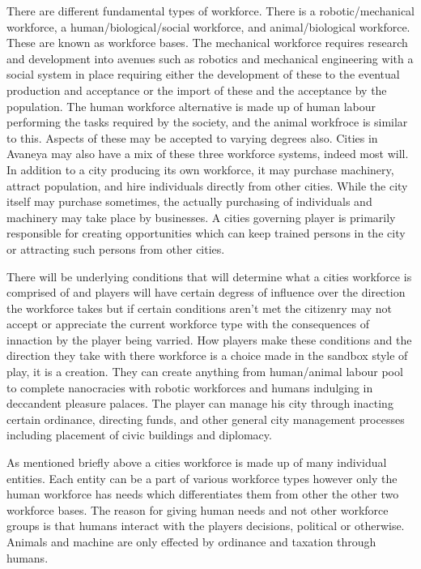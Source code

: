 There are different fundamental types of workforce. There is a robotic/mechanical workforce, a human/biological/social workforce, and animal/biological workforce. These are known as workforce bases. The mechanical workforce requires research and development into avenues such as robotics and mechanical engineering with a social system in place requiring either the development of these to the eventual production and acceptance or the import of these and the acceptance by the population. The human workforce alternative is made up of human labour performing the tasks required by the society, and the animal workfroce is similar to this. Aspects of these may be accepted to varying degrees also. Cities in Avaneya may also have a mix of these three workforce systems, indeed most will. In addition to a city producing its own workforce, it may purchase machinery, attract population, and hire individuals directly from other cities. While the city itself may purchase sometimes, the actually purchasing of individuals and machinery may take place by businesses. A cities governing player is primarily responsible for creating opportunities which can keep trained persons in the city or attracting such persons from other cities. 

There will be underlying conditions that will determine what a cities workforce is comprised of and players will have certain degress of influence over the direction the workforce takes but if certain conditions aren't met the citizenry may not accept or appreciate the current workforce type with the consequences of innaction by the player being varried. How players make these conditions and the direction they take with there workforce is a choice made in the sandbox style of play, it is a creation. They can create anything from human/animal labour pool to complete nanocracies with robotic workforces and humans indulging in deccandent pleasure palaces. The player can manage his city through inacting certain ordinance, directing funds, and other general city management processes including placement of civic buildings and diplomacy. 


As mentioned briefly above a cities workforce is made up of many individual entities. Each entity can be a part of various workforce types however only the human workforce has needs which differentiates them from other the other two workforce bases. The reason for giving human needs and not other workforce groups is that humans interact with the players decisions, political or otherwise. Animals and machine are only effected by ordinance and taxation through humans. 

